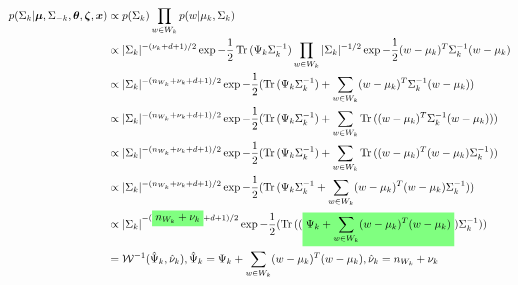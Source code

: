 \documentclass[12pt]{article}
\newcommand{\ghighlight}[1]{%
  \colorbox{green!50}{$\displaystyle#1$}}
\DeclareMathOperator{\Tr}{Tr}
\begin{document}
\begin{equation*}
\begin{split}
p(\Sigma_k | \bm{\mu}, \Sigma_{-k}, \bm{\theta}, \bm{\zeta}, \bm{x}) & \propto p(\Sigma_k) \prod_{w \in W_k} p(w | \mu_k, \Sigma_k) \\
& \propto |\Sigma_k|^{-(\nu_k + d + 1)/2} \exp{-\frac{1}{2} \Tr{(\Psi_k\Sigma_k^{-1})}}\prod_{w \in W_k} |\Sigma_k|^{-1/2} \exp{-\frac{1}{2}(w - \mu_k)^T\Sigma_k^{-1}(w - \mu_k)} \\
& \propto |\Sigma_k|^{-(n_{W_k} + \nu_k + d + 1)/2} \exp{-\frac{1}{2} (\Tr{(\Psi_k\Sigma_k^{-1})} + \sum_{w \in W_k} (w - \mu_k)^T\Sigma_k^{-1}(w - \mu_k))} \\
& \propto |\Sigma_k|^{-(n_{W_k} + \nu_k + d + 1)/2} \exp{-\frac{1}{2} (\Tr{(\Psi_k\Sigma_k^{-1})} + \sum_{w \in W_k} \Tr{((w - \mu_k)^T\Sigma_k^{-1}(w - \mu_k))})} \\
& \propto |\Sigma_k|^{-(n_{W_k} + \nu_k + d + 1)/2} \exp{-\frac{1}{2} (\Tr{(\Psi_k\Sigma_k^{-1})} + \sum_{w \in W_k} \Tr{((w - \mu_k)^T(w - \mu_k)\Sigma_k^{-1})})} \\
& \propto |\Sigma_k|^{-(n_{W_k} + \nu_k + d + 1)/2} \exp{-\frac{1}{2} (\Tr{(\Psi_k\Sigma_k^{-1} + \sum_{w \in W_k} (w - \mu_k)^T(w - \mu_k)\Sigma_k^{-1})})} \\
& \propto |\Sigma_k|^{-(\ghighlight{n_{W_k} + \nu_k} + d + 1)/2} \exp{-\frac{1}{2} (\Tr{((\ghighlight{\Psi_k + \sum_{w \in W_k} (w - \mu_k)^T(w - \mu_k)})\Sigma_k^{-1})})} \\
& = \mathcal{W}^{-1}(\hat{\Psi}_k, \hat{\nu}_k), \hat{\Psi}_k = \Psi_k + \sum_{w \in W_k} (w - \mu_k)^T(w - \mu_k), \hat{\nu}_k = n_{W_k} + \nu_k 
\end{split}
\end{equation*}
\end{document}

